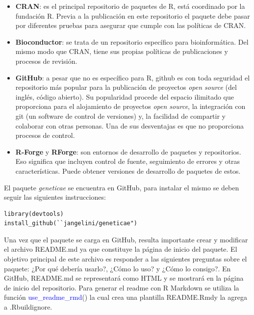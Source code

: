 \begin{itemize}
\item \textbf{CRAN}: es el principal repositorio de paquetes de R, está coordinado por la fundación R. Previa a la publicación en este repositorio el paquete debe pasar por diferentes pruebas para asegurar que cumple con las políticas de CRAN.

\item \textbf{Bioconductor}: se trata de un repositorio específico para bioinformática. Del mismo modo que CRAN, tiene sus propias políticas de publicaciones y procesos de revisión.

\item \textbf{GitHub}: a pesar que no es específico para R, github es con toda seguridad el repositorio más popular para la publicación de proyectos \emph{open source} (del inglés, código abierto). Su popularidad procede del espacio ilimitado que proporciona para el alojamiento de proyectos \emph{open source}, la integración con git (un software de control de versiones) y, la facilidad de compartir y colaborar con otras personas. Una de sus desventajas es que no proporciona procesos de control.

\item \textbf{R-Forge} y \textbf{RForge}: son entornos de desarrollo de paquetes y repositorios. Eso significa que incluyen control de fuente, seguimiento de errores y otras características. Puede obtener versiones de desarrollo de paquetes de estos.
\end{itemize}

El paquete \emph{geneticae} se encuentra en GitHub, para instalar el mismo se deben seguir las siguientes instrucciones:

\begin{lstlisting}
library(devtools)
install_github(``jangelini/geneticae") 
\end{lstlisting}


Una vez que el paquete se carga en GitHub, resulta importante crear y modificar el archivo README.md ya que constituye la página de inicio del paquete. El objetivo principal de este archivo es responder a las siguientes preguntas sobre el paquete: ¿Por qué debería usarlo?, ¿Cómo lo uso? y ¿Cómo lo consigo?. En GitHub, README.md se representará como HTML y se mostrará en la página de inicio del repositorio. Para generar el readme con R Markdown se utiliza la función \textcolor{blue}{use\_readme\_rmd}() la cual crea una plantilla README.Rmdy la agrega a .Rbuildignore.

